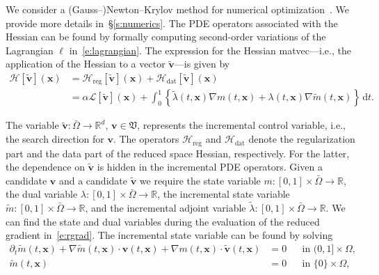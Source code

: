 \documentclass[11pt]{amsart}
\newcommand{\secref}[1]{\S\ref{#1}}
\newcommand\fs[1]{\ensuremath{\mathfrak{#1}}}
\newcommand\op[1]{\ensuremath{\mathcal{#1}}}
\newcommand\igrad{\ensuremath{\nabla}}
\renewcommand{\d}{\ensuremath{\text{d}}}
\renewcommand{\vec}[1]{\ensuremath{\boldsymbol{#1}}}
\begin{document}
We consider a (Gauss--)Newton--Krylov method for numerical optimization~\cite{Mang:2015a}. We provide more details in~\secref{s:numerics}. The PDE operators associated with the Hessian can be found by formally computing second-order variations of the Lagrangian $\ell$ in~\eqref{e:lagrangian}. The expression for the Hessian matvec---i.e., the application of the Hessian to a vector $\vec{\tilde{v}}$---is given by
\begin{equation}\label{e:matvec}
\begin{aligned}
\op{H}[\vec{\tilde{v}}](\vec{x})
& =
\op{H}_{\text{reg}}[\vec{\tilde{v}}](\vec{x})
+ \op{H}_{\text{dat}}[\vec{\tilde{v}}](\vec{x})
\\
& =
\alpha\op{L}[\vec{\tilde{v}}](\vec{x})
+ \int_0^1
\left\{ \tilde{\lambda}(t,\vec{x}) \igrad m(t,\vec{x})
+ \lambda(t,\vec{x}) \igrad \tilde{m}(t,\vec{x})\right\}
\, \d t.
\end{aligned}
\end{equation}

\noindent The variable $\vec{\tilde{v}} : \bar{\Omega} \to \mathbb{R}^d$, $\vec{v} \in \fs{V}$, represents the incremental control variable, i.e., the search direction for $\vec{v}$. The operators $\op{H}_{\text{reg}}$ and $\op{H}_{\text{dat}}$ denote the regularization part and the data part of the reduced space Hessian, respectively. For the latter, the dependence on $\vec{\tilde{v}}$ is hidden in the incremental PDE operators. Given a candidate $\vec{v}$ and a candidate $\vec{\tilde{v}}$ we require the state variable $m : [0,1] \times \bar{\Omega} \to \mathbb{R}$, the dual variable $\lambda : [0,1] \times \bar{\Omega} \to \mathbb{R}$, the incremental state variable $\tilde{m} : [0,1] \times \bar{\Omega} \to \mathbb{R}$, and the incremental adjoint variable $\tilde{\lambda} : [0,1] \times \bar{\Omega} \to \mathbb{R}$. We can find the state and dual variables during the evaluation of the reduced gradient in~\eqref{e:rgrad}. The incremental state variable can be found by solving
\begin{subequations}\label{e:incstate}
\begin{align}
\partial_t \tilde{m}(t,\vec{x})
+ \igrad \tilde{m}(t,\vec{x}) \cdot \vec{v}(t,\vec{x})
+ \igrad m(t,\vec{x}) \cdot \vec{\tilde{v}}(t,\vec{x})
& = 0
&& \text{in}\,\,(0,1] \times \Omega,
\\
\tilde{m}(t,\vec{x}) &= 0
&& \text{in}\,\,\{0\} \times \Omega,
\end{align}
\end{subequations}
\end{document}
